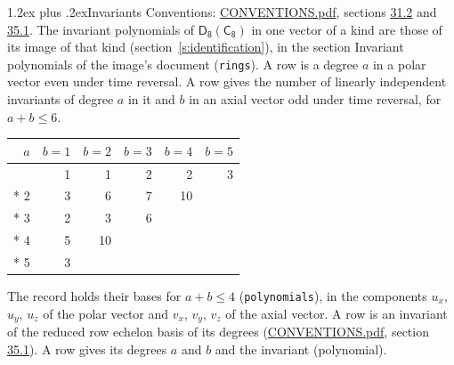 \documentclass[10pt,a4paper]{article}
\makeatletter
\renewcommand\section{\@startsection{section}{1}{\z@}{-3ex plus -1ex minus -.2ex}%
  {1.2ex plus .2ex}{\normalfont\large\sffamily\bfseries\color{parttitle}}}
\numberwithin{equation}{section}
\newcommand{\grp}[1]{\mathsf{#1}}
\makeatother
\begin{document}
\section{Invariants}\label{s:invariants}
Conventions: \href{../../CONVENTIONS.pdf}{CONVENTIONS.pdf}, sections \href{../../CONVENTIONS.pdf\#conv.31.2}{31.2} and \href{../../CONVENTIONS.pdf\#conv.35.1}{35.1}.
The invariant polynomials of $\grp{D_{8}}(\grp{C_{8}})$ in one vector of a kind are those of its image of that kind (section~\ref{s:identification}), in the section Invariant polynomials of the image's document (\texttt{rings}).
\leavevmode\label{n:index.degree.polar}\label{n:index.degree.axial}A row is a degree $a$ in a polar vector even under time reversal. A row gives the number of linearly independent invariants of degree $a$ in it and $b$ in an axial vector odd under time reversal, for $a + b \le 6$.
{\small\begin{longtable}{@{}rrrrrr@{}}\toprule
$a$ & $b = 1$ & $b = 2$ & $b = 3$ & $b = 4$ & $b = 5$\\\midrule\endhead
\bottomrule\endfoot\endlastfoot
1 & 1 & 1 & 2 & 2 & 3\\*
2 & 3 & 6 & 7 & 10 & \\*
3 & 2 & 3 & 6 &  & \\*
4 & 5 & 10 &  &  & \\*
5 & 3 &  &  &  & \\
\bottomrule\end{longtable}}
\leavevmode\label{n:local.component.polar}\label{n:local.component.axial}The record holds their bases for $a + b \le 4$ (\texttt{polynomials}), in the components $u_{x}$, $u_{y}$, $u_{z}$ of the polar vector and $v_{x}$, $v_{y}$, $v_{z}$ of the axial vector. \label{n:head.polynomial}A row is an invariant of the reduced row echelon basis of its degrees (\href{../../CONVENTIONS.pdf}{CONVENTIONS.pdf}, section \href{../../CONVENTIONS.pdf\#conv.35.1}{35.1}). A row gives its degrees $a$ and $b$ and the invariant (polynomial).
\end{document}
